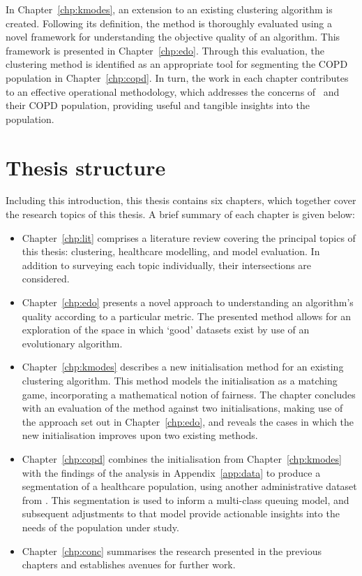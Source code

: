 In Chapter~\ref{chp:kmodes}, an extension to an existing clustering algorithm is
created. Following its definition, the method is thoroughly evaluated using a
novel framework for understanding the objective quality of an algorithm. This
framework is presented in Chapter~\ref{chp:edo}. Through this evaluation, the
clustering method is identified as an appropriate tool for segmenting the COPD
population in Chapter~\ref{chp:copd}. In turn, the work in each chapter
contributes to an effective operational methodology, which addresses the
concerns of \ctmuhb\ and their COPD population, providing useful and tangible
insights into the population.


\section{Thesis structure}\label{sec:structure}

Including this introduction, this thesis contains six chapters, which together
cover the research topics of this thesis. A brief summary of each chapter is
given below:

\begin{itemize}
    \item Chapter~\ref{chp:lit} comprises a literature review covering the
        principal topics of this thesis: clustering, healthcare modelling, and
        model evaluation. In addition to surveying each topic individually,
        their intersections are considered.
    \item Chapter~\ref{chp:edo} presents a novel approach to understanding an
        algorithm's quality according to a particular metric. The presented
        method allows for an exploration of the space in which `good' datasets
        exist by use of an evolutionary algorithm.
    \item Chapter~\ref{chp:kmodes} describes a new initialisation method for an
        existing clustering algorithm. This method models the initialisation as
        a matching game, incorporating a mathematical notion of fairness. The
        chapter concludes with an evaluation of the method against two
        initialisations, making use of the approach set out in
        Chapter~\ref{chp:edo}, and reveals the cases in which the new
        initialisation improves upon two existing methods.
    \item Chapter~\ref{chp:copd} combines the initialisation from
        Chapter~\ref{chp:kmodes} with the findings of the analysis in
        Appendix~\ref{app:data} to produce a segmentation of a healthcare
        population, using another administrative dataset from \ctmuhb. This
        segmentation is used to inform a multi-class queuing model, and
        subsequent adjustments to that model provide actionable insights into
        the needs of the population under study.
    \item Chapter~\ref{chp:conc} summarises the research presented in the
        previous chapters and establishes avenues for further work.
\end{itemize}

